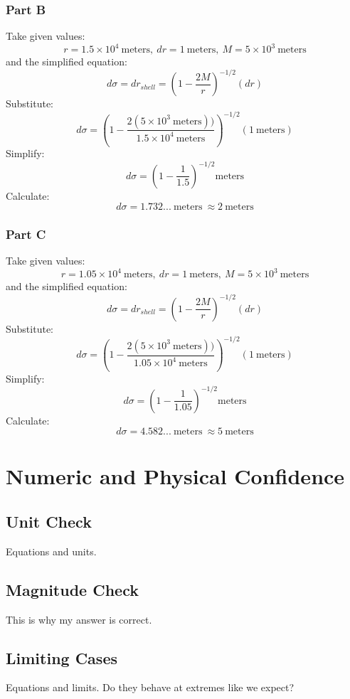 \documentclass[]{report}
\begin{document}
        \subsubsection{Part B}
          Take given values:
          $$r=1.5\times10^4\ \text{meters},\ dr=1\ \text{meters},\ M = 5\times10^3\ \text{meters}$$
          and the simplified equation:
          $$
          d\sigma = dr_{shell} = \left(1-\frac{2M}{r}\right)^{-1/2}(dr)
          $$
          Substitute:
          $$
          d\sigma = \left(1-\frac{2(5\times10^3\ \text{meters}))}{1.5\times10^4\ \text{meters}}\right)^{-1/2}(1\ \text{meters})
          $$
          Simplify:
          $$
          d\sigma = \left(1-\frac{1}{1.5}\right)^{-1/2}\text{meters}
          $$
          Calculate:
          $$d\sigma = 1.732...\ \text{meters}\ \approx 2\ \text{meters}$$

        \subsubsection{Part C}
          Take given values:
          $$r=1.05\times10^4\ \text{meters},\ dr=1\ \text{meters},\ M = 5\times10^3\ \text{meters}$$
          and the simplified equation:
          $$
          d\sigma = dr_{shell} = \left(1-\frac{2M}{r}\right)^{-1/2}(dr)
          $$
          Substitute:
          $$
          d\sigma = \left(1-\frac{2(5\times10^3\ \text{meters}))}{1.05\times10^4\ \text{meters}}\right)^{-1/2}(1\ \text{meters})
          $$
          Simplify:
          $$
          d\sigma = \left(1-\frac{1}{1.05}\right)^{-1/2}\text{meters}
          $$
          Calculate:
          $$d\sigma = 4.582...\ \text{meters}\ \approx 5\ \text{meters}$$

    \section{Numeric and Physical Confidence}

      \subsection{Unit Check}
        Equations and units.

      \subsection{Magnitude Check}
        This is why my answer is correct.

      \subsection{Limiting Cases}
        Equations and limits. Do they behave at extremes like we expect?
\end{document}
